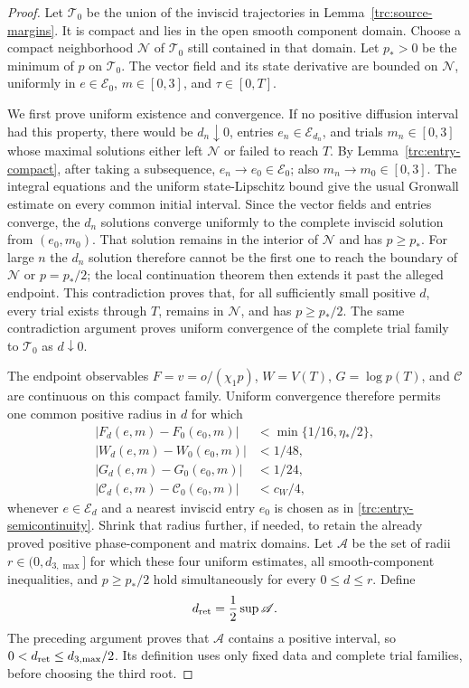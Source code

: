 \begin{proof}
Let $\mathscr T_0$ be the union of the inviscid trajectories in
Lemma~\ref{trc:source-margins}.  It is compact and lies in the open smooth
component domain.  Choose a compact neighborhood $\mathscr N$ of
$\mathscr T_0$ still contained in that domain.  Let $p_*>0$ be the minimum
of $p$ on $\mathscr T_0$.  The vector field and its state derivative are
bounded on $\mathscr N$, uniformly in $e\in\mathcal E_0$,
$m\in[0,3]$, and $\tau\in[0,T]$.

We first prove uniform existence and convergence.  If no positive
diffusion interval had this property, there would be $d_n\downarrow0$,
entries $e_n\in\mathcal E_{d_n}$, and trials $m_n\in[0,3]$ whose maximal
solutions either left $\mathscr N$ or failed to reach $T$.  By
Lemma~\ref{trc:entry-compact}, after taking a subsequence,
$e_n\to e_0\in\mathcal E_0$; also $m_n\to m_0\in[0,3]$.
The integral equations and the uniform state-Lipschitz bound give the
usual Gronwall estimate on every common initial interval.  Since the
vector fields and entries converge, the $d_n$ solutions converge uniformly
to the complete inviscid solution from $(e_0,m_0)$.  That solution remains
in the interior of $\mathscr N$ and has $p\geq p_*$.  For large $n$ the
$d_n$ solution therefore cannot be the first one to reach the boundary of
$\mathscr N$ or $p=p_*/2$; the local continuation theorem then extends it
past the alleged endpoint.  This contradiction proves that, for all
sufficiently small positive $d$, every trial exists through $T$, remains
in $\mathscr N$, and has $p\geq p_*/2$.  The same contradiction argument
proves uniform convergence of the complete trial family to
$\mathscr T_0$ as $d\downarrow0$.

The endpoint observables $F=v=o/(\chi_1p)$, $W=V(T)$,
$G=\log p(T)$, and $\mathcal C$ are continuous on this compact family.
Uniform convergence therefore permits one common positive radius in $d$
for which
\begin{align*}
 |F_d(e,m)-F_0(e_0,m)|&<\min\{1/16,\eta_*/2\},\\
 |W_d(e,m)-W_0(e_0,m)|&<1/48,\\
 |G_d(e,m)-G_0(e_0,m)|&<1/24,\\
 |\mathcal C_d(e,m)-\mathcal C_0(e_0,m)|&<c_W/4,
\end{align*}
whenever $e\in\mathcal E_d$ and a nearest inviscid entry $e_0$ is chosen
as in \eqref{trc:entry-semicontinuity}.  Shrink that radius further, if
needed, to retain the already proved positive phase-component and matrix
domains.  Let $\mathscr A$ be the set of radii
$r\in(0,d_{3,\max}]$ for which these four uniform estimates, all
smooth-component inequalities, and $p\geq p_*/2$ hold simultaneously for
every $0\leq d\leq r$.  Define
\begin{equation}\label{trc:dret-definition}
 d_{\rm ret}=\frac12\sup\mathscr A.
\end{equation}
The preceding argument proves that $\mathscr A$ contains a positive
interval, so $0<d_{\rm ret}\leq d_{3,\max}/2$.  Its definition uses only
fixed data and complete trial families, before choosing the third root.


\end{proof}
